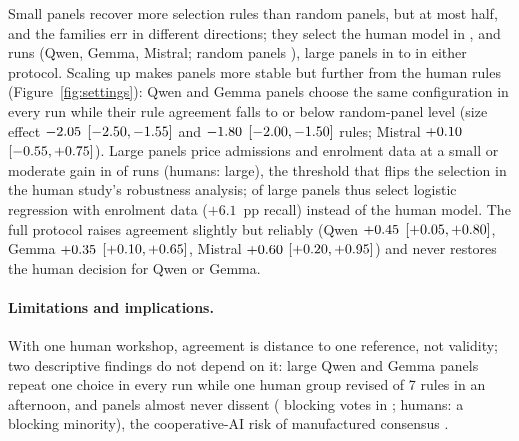\documentclass[11pt,a4paper]{article}
\begin{document}

Small panels recover more selection rules than random panels, but at most half, and the families err in different directions; they select the human model in \decisionQwenSmall{}, \decisionGemmaSmall{} and \decisionMistralSmall{} runs (Qwen, Gemma, Mistral; random panels \chanceDecision{}), large panels in \decisionQwenLargeLite{} to \decisionMistralLargeLite{} in either protocol.
Scaling up makes panels more stable but further from the human rules (Figure~\ref{fig:settings}): Qwen and Gemma panels choose the same configuration in every run while their rule agreement falls to or below random-panel level (size effect $-2.05$ $[-2.50, -1.55]$ and $-1.80$ $[-2.00, -1.50]$ rules; Mistral $+0.10$ $[-0.55, +0.75]$).
Large panels price admissions and enrolment data at a small or moderate gain in \enrolLowLarge{} of \nRunsLarge{} runs (humans: large), the threshold that flips the selection in the human study's robustness analysis; \lrcLarge{} of \nRunsLarge{} large panels thus select logistic regression with enrolment data ($+6.1$~pp recall) instead of the human model.
The full protocol raises agreement slightly but reliably (Qwen $+0.45$ $[+0.05, +0.80]$, Gemma $+0.35$ $[+0.10, +0.65]$, Mistral $+0.60$ $[+0.20, +0.95]$) and never restores the human decision for Qwen or Gemma.

\paragraph{Limitations and implications.}
With one human workshop, agreement is distance to one reference, not validity; two descriptive findings do not depend on it: large Qwen and Gemma panels repeat one choice in every run while one human group revised \humanChangedRules{} of 7 rules in an afternoon, and panels almost never dissent (\blockCardsAll{} blocking votes in \nCardsAll{}; humans: a blocking minority), the cooperative-AI risk of manufactured consensus \citep{dafoe2020open,tessler2024habermas}.


\end{document}
